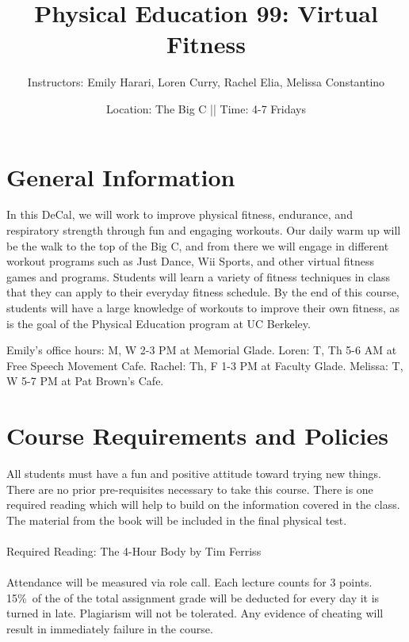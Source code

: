 \documentclass[letterpaper,12pt]{article}
\begin{document}
\title{Physical Education 99: Virtual Fitness}
\date{Location: The Big C || Time: 4-7 Fridays }
\author{Instructors: Emily Harari, Loren Curry, Rachel Elia, Melissa Constantino}
\maketitle

\section{General Information}



In this DeCal, we will work to improve physical fitness, endurance, and respiratory strength through fun and engaging workouts. Our daily warm up will be the walk to the top of the Big C, and from there we will engage in different workout programs such as Just Dance, Wii Sports, and other virtual fitness games and programs. Students will learn a variety of fitness techniques in class that they can apply to their everyday fitness schedule. By the end of this course, students will have a large knowledge of workouts to improve their own fitness, as is the goal of the Physical Education program at UC Berkeley.  

Emily's office hours: M, W 2-3 PM at Memorial Glade. Loren: T, Th 5-6 AM at Free Speech Movement Cafe. Rachel: Th, F 1-3 PM at Faculty Glade. Melissa: T, W 5-7 PM at Pat Brown's Cafe.


\section{Course Requirements and Policies}

All students must have a fun and positive attitude toward trying new things. There are no prior pre-requisites necessary to take this course. There is one required reading which will help to build on the information covered in the class. The material from the book will be included in the final physical test.\\
\\
Required Reading: The 4-Hour Body by Tim Ferriss \\
\\
Attendance will be measured via role call. Each lecture counts for 3 points. 15\%\ of the  of the total assignment grade will be deducted for every day it is turned in late. Plagiarism will not be tolerated. Any evidence of cheating will result in immediately failure in the course.
\end{document}
